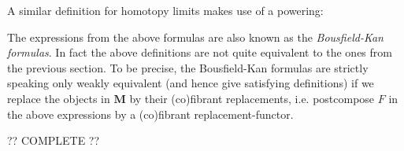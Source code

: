     A similar definition for homotopy limits makes use of a powering:
    \begin{remark}
        The expressions from the above formulas are also known as the \textit{Bousfield-Kan formulas}. In fact the above definitions are not quite equivalent to the ones from the previous section. To be precise, the Bousfield-Kan formulas are strictly speaking only weakly equivalent (and hence give satisfying definitions) if we replace the objects in $\mathbf{M}$ by their (co)fibrant replacements, i.e. postcompose $F$ in the above expressions by a (co)fibrant replacement-functor.
    \end{remark}

    ?? COMPLETE ??